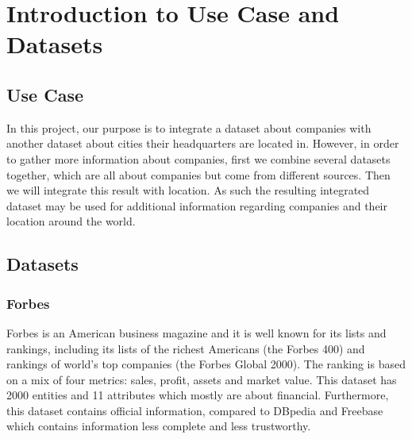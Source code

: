\section{Introduction to Use Case and Datasets}
\subsection{Use Case}
In this project, our purpose is to integrate a dataset about companies with another dataset about cities their headquarters are located in. However, in order to gather more information about companies, first we combine several datasets together, which are all about companies but come from different sources. Then we will integrate this result with location. As such the resulting integrated dataset may be used for additional information regarding companies and their location around the world.

%

\subsection{Datasets}
\subsubsection{Forbes}
Forbes is an American business magazine and it is well known for its lists and rankings, including its lists of the richest Americans (the Forbes 400) and rankings of world's top companies (the Forbes Global 2000). The ranking is based on a mix of four metrics: sales, profit, assets and market value. This dataset has 2000 entities and 11 attributes which mostly are about financial. Furthermore, this dataset contains official information, compared to DBpedia and Freebase which contains information less complete and less trustworthy.
